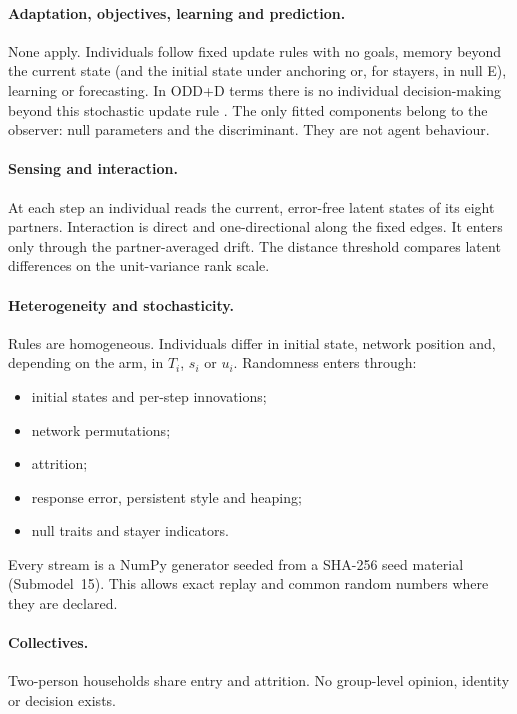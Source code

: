 \paragraph{Adaptation, objectives, learning and prediction.}
None apply. Individuals follow fixed update rules with no goals, memory beyond the current state (and the initial state under anchoring or, for stayers, in null E), learning or forecasting. In ODD+D terms there is no individual decision-making beyond this stochastic update rule \cite{muller2013oddd}. The only fitted components belong to the observer: null parameters and the discriminant. They are not agent behaviour.

\paragraph{Sensing and interaction.}
At each step an individual reads the current, error-free latent states of its eight partners. Interaction is direct and one-directional along the fixed edges. It enters only through the partner-averaged drift. The distance threshold compares latent differences on the unit-variance rank scale.

\paragraph{Heterogeneity and stochasticity.}
Rules are homogeneous. Individuals differ in initial state, network position and, depending on the arm, in $T_i$, $s_i$ or $u_i$. Randomness enters through:
\begin{itemize}
\item initial states and per-step innovations;
\item network permutations;
\item attrition;
\item response error, persistent style and heaping;
\item null traits and stayer indicators.
\end{itemize}
Every stream is a NumPy  generator seeded from a SHA-256 seed material (Submodel~15). This allows exact replay and common random numbers where they are declared.

\paragraph{Collectives.}
Two-person households share entry and attrition. No group-level opinion, identity or decision exists.

